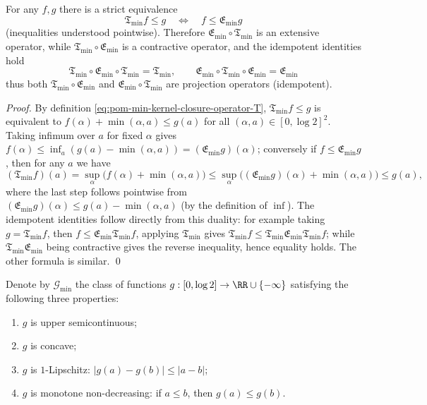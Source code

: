 \begin{theorem}\label{thm:pom-min-kernel-galois-adjunction-closure}
For any \(f,g\) there is a strict equivalence
\[
\boxed{\;
\mathfrak{T}_{\min}f\le g\quad\Longleftrightarrow\quad f\le \mathfrak{E}_{\min}g\;}
\]
(inequalities understood pointwise).
Therefore \(\mathfrak{E}_{\min}\circ\mathfrak{T}_{\min}\) is an extensive operator, while \(\mathfrak{T}_{\min}\circ\mathfrak{E}_{\min}\) is a contractive operator, and the idempotent identities hold
\[
\boxed{\;
\mathfrak{T}_{\min}\circ\mathfrak{E}_{\min}\circ\mathfrak{T}_{\min}=\mathfrak{T}_{\min},\qquad
\mathfrak{E}_{\min}\circ\mathfrak{T}_{\min}\circ\mathfrak{E}_{\min}=\mathfrak{E}_{\min}\;}
\]
thus both \(\mathfrak{T}_{\min}\circ\mathfrak{E}_{\min}\) and \(\mathfrak{E}_{\min}\circ\mathfrak{T}_{\min}\) are projection operators (idempotent).
\end{theorem}
\begin{proof}
By definition \eqref{eq:pom-min-kernel-closure-operator-T}, \(\mathfrak{T}_{\min}f\le g\) is equivalent to
\(
f(\alpha)+\min(\alpha,a)\le g(a)
\)
for all \((\alpha,a)\in[0,\log 2]^2\).
Taking infimum over \(a\) for fixed \(\alpha\) gives
\(
f(\alpha)\le \inf_a(g(a)-\min(\alpha,a))=(\mathfrak{E}_{\min}g)(\alpha)
\);
conversely if \(f\le \mathfrak{E}_{\min}g\), then for any \(a\) we have
\[
(\mathfrak{T}_{\min}f)(a)
=\sup_{\alpha}\bigl(f(\alpha)+\min(\alpha,a)\bigr)
\le \sup_{\alpha}\bigl((\mathfrak{E}_{\min}g)(\alpha)+\min(\alpha,a)\bigr)
\le g(a),
\]
where the last step follows pointwise from \((\mathfrak{E}_{\min}g)(\alpha)\le g(a)-\min(\alpha,a)\) (by the definition of \(\inf\)).
The idempotent identities follow directly from this duality: for example taking \(g=\mathfrak{T}_{\min}f\), then \(f\le \mathfrak{E}_{\min}\mathfrak{T}_{\min}f\), applying \(\mathfrak{T}_{\min}\) gives
\(
\mathfrak{T}_{\min}f\le \mathfrak{T}_{\min}\mathfrak{E}_{\min}\mathfrak{T}_{\min}f
\);
while \(\mathfrak{T}_{\min}\mathfrak{E}_{\min}\) being contractive gives the reverse inequality, hence equality holds. The other formula is similar. \qed
\end{proof}

\begin{definition}\label{def:pom-min-kernel-class-G}
Denote by \(\mathcal{G}_{\min}\) the class of functions \(g:[0,\log 2]\to\RR\cup\{-\infty\}\) satisfying the following three properties:
\begin{enumerate}
  \item \(g\) is upper semicontinuous;
  \item \(g\) is concave;
  \item \(g\) is \(1\)-Lipschitz: \(|g(a)-g(b)|\le |a-b|\);
  \item \(g\) is monotone non-decreasing: if \(a\le b\), then \(g(a)\le g(b)\).
\end{enumerate}
\end{definition}

